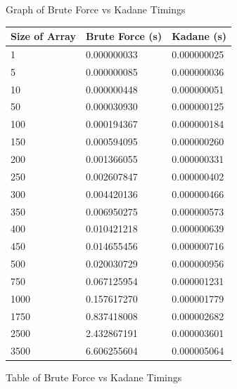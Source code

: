 \documentclass[10pt, letterpaper]{article}
\begin{document}
	\begin{figure}[!htb]
	\caption{
		\label{fig:time-graph} Graph of Brute Force vs Kadane Timings
	}
	\end{figure}


	\begin{figure}[!htb]
	\begin{center}
	\caption{
		\label{fig:time-table} Table of Brute Force vs Kadane Timings
	}
	\medskip
	\begin{tabular}{ | p{2cm} | l | l | }
			\hline
			Size of Array & Brute Force (s) & Kadane (s) \\ \hline
			1 & 0.000000033 & 0.000000025 \\ \hline
			5 & 0.000000085 & 0.000000036 \\ \hline
			10 & 0.000000448 & 0.000000051 \\ \hline
			50 & 0.000030930 & 0.000000125 \\ \hline
			100 & 0.000194367 & 0.000000184 \\ \hline
			150 & 0.000594095 & 0.000000260 \\ \hline
			200 & 0.001366055 & 0.000000331 \\ \hline
			250 & 0.002607847 & 0.000000402 \\ \hline
			300 & 0.004420136 & 0.000000466 \\ \hline
			350 & 0.006950275 & 0.000000573 \\ \hline
			400 & 0.010421218 & 0.000000639 \\ \hline
			450 & 0.014655456 & 0.000000716 \\ \hline
			500 & 0.020030729 & 0.000000956 \\ \hline
			750 & 0.067125954 & 0.000001231 \\ \hline
			1000 & 0.157617270 & 0.000001779 \\ \hline
			1750 & 0.837418008 & 0.000002682 \\ \hline
			2500 & 2.432867191 & 0.000003601 \\ \hline
			3500 & 6.606255604 & 0.000005064 \\ \hline
		\end{tabular}
	\end{center}
\end{figure}
\end{document}
